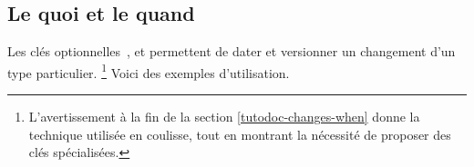 \documentclass[10pt, a4paper, theme = color]{tutodoc}
\begin{document}
\subsection{Le quoi et le quand}

Les clés optionnelles \,,  et  permettent de dater et versionner un changement d'un type particulier.%
\footnote{
    L'avertissement à la fin de la section \ref{tutodoc-changes-when} donne la technique utilisée en coulisse, tout en montrant la nécessité de proposer des clés spécialisées.
}
Voici des exemples d'utilisation.

\end{document}
